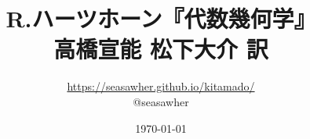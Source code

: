 \documentclass[10pt]{jsarticle}%
\begin{document}
\title{R.ハーツホーン『代数幾何学』\\高橋宣能 松下大介 訳}
\author{\url{https://seasawher.github.io/kitamado/} \\ @seasawher}
\date{\today}
\maketitle




\newpage



\newpage



\newpage



\newpage



\newpage



\newpage



\newpage



\newpage



\newpage



\newpage



\newpage
\end{document}
